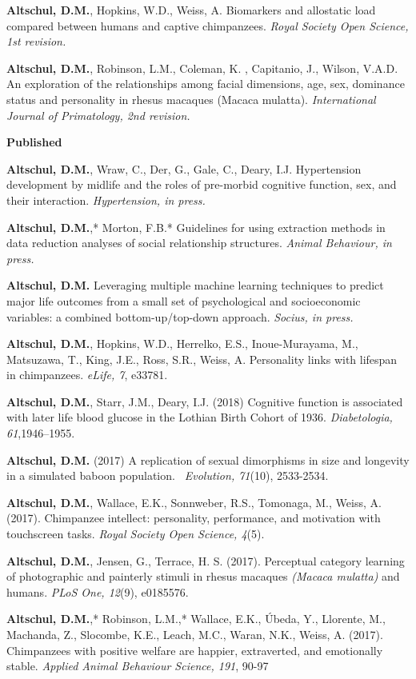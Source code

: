 \documentclass[margin,line]{res}
\begin{document}
\begin{resume}
{\bf Altschul, D.M.}, Hopkins, W.D., Weiss, A. Biomarkers and allostatic load compared between humans and captive chimpanzees. {\it  Royal Society Open Science, 1st revision.}

{\bf Altschul, D.M.}, Robinson, L.M., Coleman, K. , Capitanio, J., Wilson, V.A.D. An exploration of the relationships among facial dimensions, age, sex, dominance
status and personality in rhesus macaques (Macaca mulatta). {\it International Journal of Primatology, 2nd revision.}


\vspace{0.3cm}

{\bf Published}

{\bf Altschul, D.M.}, Wraw, C., Der, G., Gale, C., Deary, I.J. Hypertension development by midlife and the roles of pre-morbid cognitive function, sex, and their interaction. {\it Hypertension, in press.}

{\bf Altschul, D.M.},* Morton, F.B.* Guidelines for using extraction methods in data reduction analyses of social relationship structures.  {\it Animal Behaviour, in press.}

{\bf Altschul, D.M.}  Leveraging multiple machine learning techniques to predict major life outcomes from a small set of psychological and socioeconomic variables: a combined bottom-up/top-down approach. {\it Socius, in press.}

{\bf Altschul, D.M.}, Hopkins, W.D., Herrelko, E.S., Inoue-Murayama, M., Matsuzawa, T., King, J.E., Ross, S.R., Weiss, A. Personality links with lifespan in chimpanzees. {\it eLife, 7}, e33781.

{\bf Altschul, D.M.}, Starr, J.M., Deary, I.J. (2018) Cognitive function is associated with later life blood glucose in the Lothian Birth Cohort of 1936. {\it Diabetologia, 61},1946–1955.

{\bf Altschul, D.M.} (2017) A replication of sexual dimorphisms in size and longevity in a simulated baboon population. {\it\ Evolution, 71}(10), 2533-2534.

{\bf Altschul, D.M.}, Wallace, E.K., Sonnweber, R.S., Tomonaga, M., Weiss, A. (2017). Chimpanzee intellect: personality, performance, and motivation with touchscreen tasks. {\it Royal Society Open Science, 4}(5).

{\bf Altschul, D.M.}, Jensen, G.,  Terrace, H. S. (2017). Perceptual category learning of photographic and painterly stimuli in rhesus macaques {\it (Macaca mulatta)} and humans.  {\it PLoS One, 12}(9), e0185576.

{\bf Altschul, D.M.},* Robinson, L.M.,* Wallace, E.K., \'{U}beda, Y., Llorente, M., Machanda, Z., Slocombe, K.E., Leach, M.C., Waran, N.K., Weiss, A. (2017). Chimpanzees with positive welfare are happier, extraverted, and emotionally stable. {\it Applied Animal Behaviour Science, 191}, 90-97


\end{resume}
\end{document}
